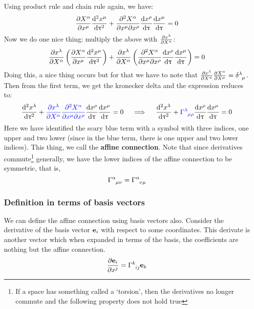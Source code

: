 Using product rule and chain rule again, we have:
$$\pdv{X^\alpha}{x^\mu}\dv[2]{x^\mu}{\uptau} +\pdv{X^\alpha}{x^\mu}{x^\rho} \dv{x^\rho}{\uptau} \dv{x^\mu}{\uptau}=0$$
Now we do one nice thing: multiply the above with $\pdv{x^\lambda}{X^\alpha}$:
$$\pdv{x^\lambda}{X^\alpha}\left( \pdv{X^\alpha}{x^\mu}\dv[2]{x^\mu}{\uptau} \right) +\pdv{x^\lambda}{X^\alpha}\left( \pdv{X^\alpha}{x^\mu}{x^\rho} \dv{x^\rho}{\uptau} \dv{x^\mu}{\uptau} \right)=0$$
Doing this, a nice thing occurs but for that we have to note that $\pdv{x^\lambda}{X^\alpha}\pdv{X^\alpha}{X^\mu} = \tensor{\delta}{^\lambda _\mu}$. Then from the first term, we get the kronecker delta and the expression reduces to:
$$\dv[2]{x^\lambda}{\uptau} +\mathcolor{blue}{\pdv{x^\lambda}{X^\alpha}\pdv{X^\alpha}{x^\mu}{x^\rho}} \dv{x^\rho}{\uptau} \dv{x^\mu}{\uptau}=0 \quad \implies \quad \dv[2]{x^\lambda}{\uptau} +\mathcolor{blue}{\tensor{\Gamma}{^\lambda _\mu _\rho}} \dv{x^\rho}{\uptau} \dv{x^\mu}{\uptau}=0$$
Here we have identified the scary blue term with a symbol with three indices, one upper and two lower (since in the blue term, there is one upper and two lower indices). This thing, we call the \textbf{affine connection}. 
Note that since derivatives commute\footnote{If a space has something called a `torsion', then the derivatives no longer commute and the following property does not hold true} generally, we have the lower indices of the affine connection to be symmetric, that is,
$$\tensor{\Gamma}{^\alpha _\mu _\nu} =\tensor{\Gamma}{^\alpha _\nu _\mu}$$
\subsubsection{Definition in terms of basis vectors}
We can define the affine connection using basis vectors also. Consider the derivative of the basis vector $\boldsymbol{\mathbf{e}}_i$ with respect to some coordinates. This derivate is another vector which when expanded in terms of the basis, the coefficients are nothing but the affine connection. 
$$\pdv{\veb{e}_i}{x^j} = \tensor{\Gamma}{^k _{ij}}\veb{e}_k$$

